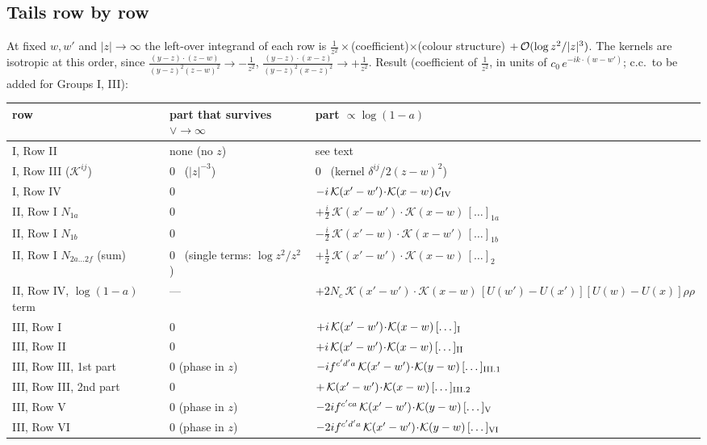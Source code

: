 \documentclass[9pt]{article}
\numberwithin{equation}{section}
\begin{document}
\subsection{Tails row by row}
\noindent At fixed $w,w'$ and $|z|\to\infty$ the left-over integrand of each row is $\frac{1}{z^{2}}\times$(coefficient)$\times$(colour structure) $+\,{\cal O}(\log z^{2}/|z|^{3})$. The kernels are isotropic at this order, since $\frac{(y-z)\cdot(z-w)}{(y-z)^{2}(z-w)^{2}}\to-\frac{1}{z^{2}}$, $\frac{(y-z)\cdot(x-z)}{(y-z)^{2}(x-z)^{2}}\to+\frac{1}{z^{2}}$. Result (coefficient of $\frac{1}{z^{2}}$, in units of $c_{0}\,e^{-ik\cdot(w-w')}$; c.c.\ to be added for Groups I, III):
\begin{center}
\begin{tabular}{|l|l|l|}
\hline
row & part that survives $\vee\to\infty$ & part $\propto\log(1-a)$ \\ \hline
I, Row II & none (no $z$) & see text \\
I, Row III ($\mathcal K^{ij}$) & $0$ \ ($|z|^{-3}$) & $0$ \ (kernel $\delta^{ij}/2(z-w)^{2}$) \\
I, Row IV & $0$ & $-i\,\mathcal K(x'-w')\!\cdot\!\mathcal K(x-w)\,\mathcal C_{\rm IV}$ \\
II, Row I $N_{1a}$ & $0$ & $+\frac{i}{2}\,\mathcal K(x'-w')\!\cdot\!\mathcal K(x-w)\,[\dots]_{1a}$ \\
II, Row I $N_{1b}$ & $0$ & $-\frac{i}{2}\,\mathcal K(x'-w)\!\cdot\!\mathcal K(x-w')\,[\dots]_{1b}$ \\
II, Row I $N_{2a\dots2f}$ (sum) & $0$ \ (single terms: $\log z^{2}/z^{2}$) & $+\frac12\,\mathcal K(x'-w')\!\cdot\!\mathcal K(x-w)\,[\dots]_{2}$ \\
II, Row IV, $\log(1-a)$ term & --- & $+2N_{c}\,\mathcal K(x'-w')\!\cdot\!\mathcal K(x-w)\,[U(w')-U(x')][U(w)-U(x)]\rho\rho$ \\
III, Row I & $0$ & $+i\,\mathcal K(x'-w')\!\cdot\!\mathcal K(x-w)\,[\dots]_{\rm I}$ \\
III, Row II & $0$ & $+i\,\mathcal K(x'-w')\!\cdot\!\mathcal K(x-w)\,[\dots]_{\rm II}$ \\
III, Row III, 1st part & $0$ (phase in $z$) & $-i f^{c'd'a}\,\mathcal K(x'-w')\!\cdot\!\mathcal K(y-w)\,[\dots]_{\rm III.1}$ \\
III, Row III, 2nd part & $0$ & $+\,\mathcal K(x'-w')\!\cdot\!\mathcal K(x-w)\,[\dots]_{\rm III.2}$ \\
III, Row V & $0$ (phase in $z$) & $-2i f^{c'ca}\,\mathcal K(x'-w')\!\cdot\!\mathcal K(y-w)\,[\dots]_{\rm V}$ \\
III, Row VI & $0$ (phase in $z$) & $-2i f^{c'd'a}\,\mathcal K(x'-w')\!\cdot\!\mathcal K(y-w)\,[\dots]_{\rm VI}$ \\ \hline
\end{tabular}
\end{center}
\end{document}
